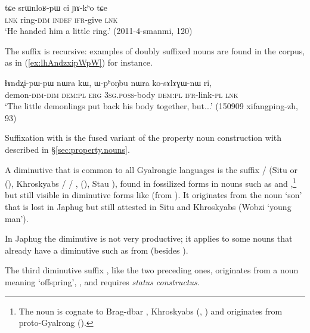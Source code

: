 \begin{exe}
\ex \label{ex:srWnloR}
\gll tɕe srɯnloʁ-pɯ ci ɲɤ-kʰo tɕe \\
\textsc{lnk} ring-\textsc{dim} \textsc{indef} \textsc{ifr}-give \textsc{lnk} \\
\glt `He handed him a little ring.' (2011-4-smanmi, 120)
\end{exe}

The suffix  is recursive: examples of doubly suffixed nouns are found in the corpus, as in (\ref{ex:lhAndzxipWpW}) for instance. 

\begin{exe}
\ex \label{ex:lhAndzxipWpW}
\gll  ɬɤndʐi-pɯ-pɯ nɯra kɯ, ɯ-pʰoŋbu nɯra ko-sɤlɤɣɯ-nɯ ri, \\
demon-\textsc{dim}-\textsc{dim} \textsc{dem}:\textsc{pl} \textsc{erg} \textsc{3sg}.\textsc{poss}-body \textsc{dem}:\textsc{pl} \textsc{ifr}-link-\textsc{pl} \textsc{lnk} \\
\glt `The little demonlings put back his body together, but...' (150909 xifangping-zh, 93)
\end{exe}

Suffixation with  is the fused variant of the property noun construction with  described in §\ref{sec:property.nouns}.

A diminutive that is common to all Gyalrongic languages is the suffix / (Situ  or  (\citealt[163]{linxr93jiarong}), Khroskyabs  /  / ,  (\citealt[158]{lai17khroskyabs}), Stau ), found in fossilized forms in nouns such as  and ,\footnote{The noun  is cognate to Brag-dbar , Khroskyabs  (\citealt{zhang16bragdbar}, \citealt[156]{lai17khroskyabs}) and originates from proto-Gyalrong  (\citealt[53]{jacques08zh}). } but still visible in diminutive forms like  (from ). It originates from the noun `son' that is lost in Japhug but still attested in Situ and Khroskyabs (Wobzi  `young man'). 

In Japhug the  diminutive is not very productive; it applies to some nouns that already have a  diminutive such as  from  (besides ).

The third diminutive suffix , like the two preceding ones, originates from a noun meaning `offspring', , and requires \textit{status constructus}.

